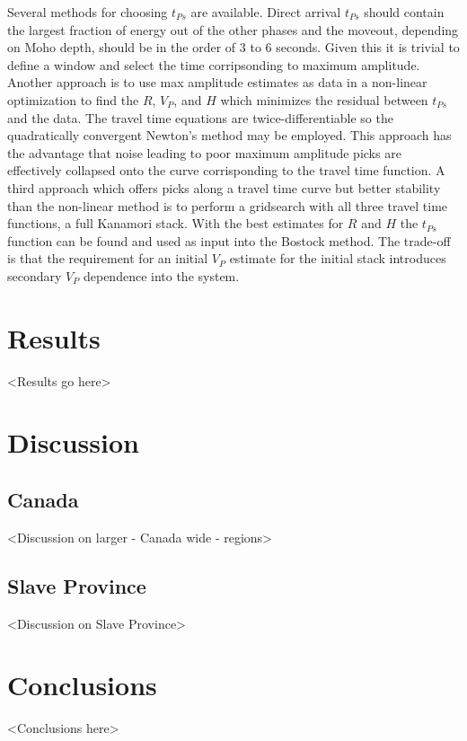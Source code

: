 \documentclass[draft]{article}
\begin{document}
Several methods for choosing $t_{Ps}$ are available. Direct arrival $t_{Ps}$ should contain the largest fraction of energy out of the other phases and the moveout, depending on Moho depth, should be in the order of 3 to 6 seconds. Given this it is trivial to define a window and select the time corripsonding to maximum amplitude. Another approach is to use max amplitude estimates as data in a non-linear optimization to find the $R$, $V_P$, and $H$ which minimizes the residual between $t_{Ps}$ and the data. The travel time equations are twice-differentiable so the quadratically convergent Newton's method may be employed. This approach has the advantage that noise leading to poor maximum amplitude picks are effectively collapsed onto the curve corrisponding to the travel time function. A third approach which offers picks along a travel time curve but better stability than the non-linear method is to perform a gridsearch with all three travel time functions, a full Kanamori stack. With the best estimates for $R$ and $H$ the $t_{Ps}$ function can be found and used as input into the Bostock method. The trade-off is that the requirement for an initial $V_P$ estimate for the initial stack introduces secondary $V_P$ dependence into the system.


\section{Results}
<Results go here>

\section{Discussion}
\subsection{Canada}
<Discussion on larger - Canada wide - regions>
\subsection{Slave Province}
<Discussion on Slave Province>

\section{Conclusions}
<Conclusions here>
\end{document}
